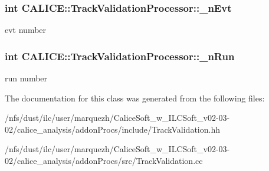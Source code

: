 \subsubsection[{\-\_\-n\-Evt}]{\setlength{\rightskip}{0pt plus 5cm}int C\-A\-L\-I\-C\-E\-::\-Track\-Validation\-Processor\-::\-\_\-n\-Evt\hspace{0.3cm}{\ttfamily [protected]}}\label{classCALICE_1_1TrackValidationProcessor_aa416b3b756c930a0dea555886d1cf39c}
evt number 
\subsubsection[{\-\_\-n\-Run}]{\setlength{\rightskip}{0pt plus 5cm}int C\-A\-L\-I\-C\-E\-::\-Track\-Validation\-Processor\-::\-\_\-n\-Run\hspace{0.3cm}{\ttfamily [protected]}}\label{classCALICE_1_1TrackValidationProcessor_af235f7e8a5a00894c66e467f55552bfe}
run number 

The documentation for this class was generated from the following files\-:\begin{DoxyCompactItemize}
\item 
/nfs/dust/ilc/user/marquezh/\-Calice\-Soft\-\_\-w\-\_\-\-I\-L\-C\-Soft\-\_\-v02-\/03-\/02/calice\-\_\-analysis/addon\-Procs/include/Track\-Validation.\-hh\item 
/nfs/dust/ilc/user/marquezh/\-Calice\-Soft\-\_\-w\-\_\-\-I\-L\-C\-Soft\-\_\-v02-\/03-\/02/calice\-\_\-analysis/addon\-Procs/src/Track\-Validation.\-cc\end{DoxyCompactItemize}
